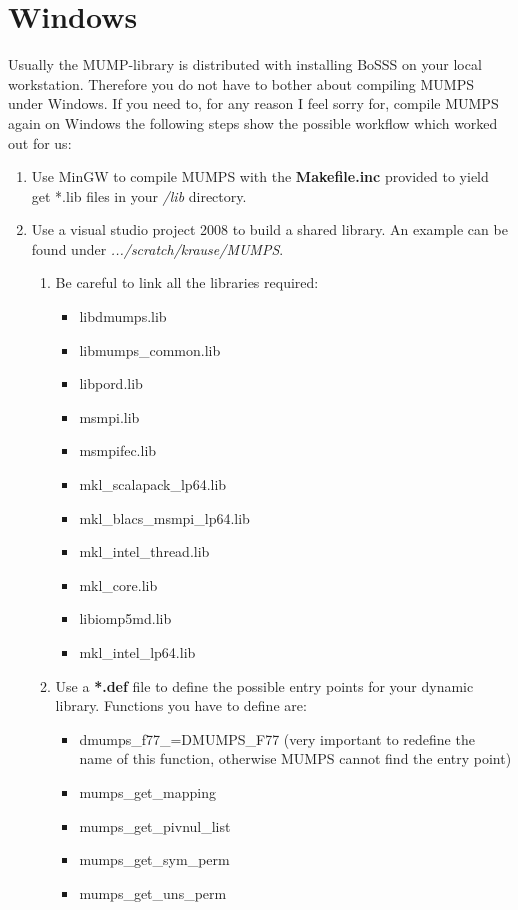 \documentclass[11pt,twoside,a4paper]{fdyartcl}
\theoremstyle{myPlain}
\theoremstyle{myDefinition}
\begin{document}
\section{Windows}
Usually the MUMP-library is distributed with installing BoSSS on your local workstation. Therefore you do not have to bother about compiling MUMPS under Windows. If you need to, for any reason I feel sorry for, compile MUMPS again on Windows the following steps show the possible workflow which worked out for us:
\begin{enumerate}
	\item Use MinGW to compile MUMPS with the \textbf{Makefile.inc} provided to yield get *.lib files in your \textit{/lib} directory.
	\item Use a visual studio project 2008 to build a shared library. An example can be found under \textit{.../scratch/krause/MUMPS}.
	\begin{enumerate}
		\item Be careful to link all the libraries required:
		\begin{itemize}
			\item libdmumps.lib 
			\item libmumps\_common.lib 
			\item libpord.lib
			\item msmpi.lib 
			\item msmpifec.lib 
			\item mkl\_scalapack\_lp64.lib 
			\item mkl\_blacs\_msmpi\_lp64.lib 
			\item mkl\_intel\_thread.lib 
			\item mkl\_core.lib 
			\item libiomp5md.lib 
			\item mkl\_intel\_lp64.lib
		\end{itemize}
		\item Use a \textbf{*.def} file to define the possible entry points for your dynamic library. Functions you have to define are:
		\begin{itemize}
			\item	dmumps\_f77\_=DMUMPS\_F77 (very important to redefine the name of this function, otherwise MUMPS cannot find the entry point)
			\item 	mumps\_get\_mapping
			\item 	mumps\_get\_pivnul\_list
			\item	mumps\_get\_sym\_perm
			\item mumps\_get\_uns\_perm
		\end{itemize}	
	\end{enumerate}
\end{enumerate}
\end{document}
